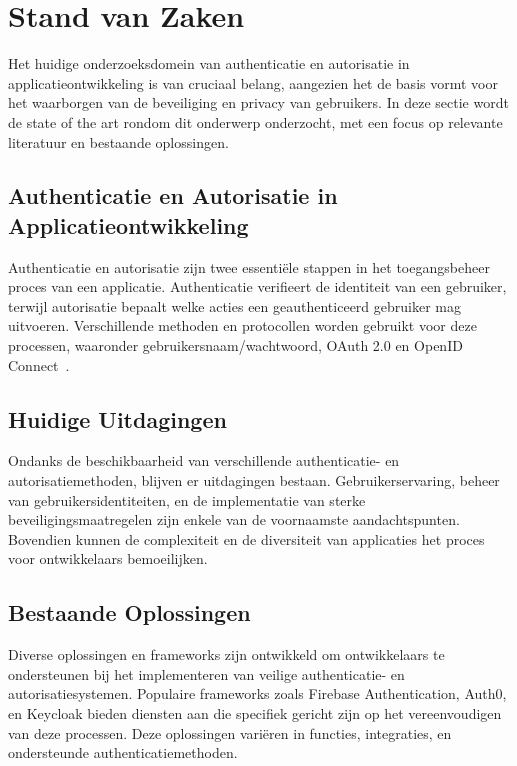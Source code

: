 
\section{Stand van Zaken}%
\label{sec:state-of-the-art}

Het huidige onderzoeksdomein van authenticatie en autorisatie in applicatieontwikkeling is van cruciaal belang, aangezien het de basis vormt voor het
waarborgen van de beveiliging en privacy van gebruikers. In deze sectie wordt de state of the art rondom dit onderwerp onderzocht, met een focus op
relevante literatuur en bestaande oplossingen.

\subsection{Authenticatie en Autorisatie in Applicatieontwikkeling}

Authenticatie en autorisatie zijn twee essentiële stappen in het toegangsbeheer proces van een applicatie. Authenticatie verifieert de identiteit van
een gebruiker, terwijl autorisatie bepaalt welke acties een geauthenticeerd gebruiker mag uitvoeren. Verschillende methoden en protocollen worden
gebruikt voor deze processen, waaronder gebruikersnaam/wachtwoord, OAuth 2.0 en OpenID Connect~\autocite{Hardt2012}.

\subsection{Huidige Uitdagingen}

Ondanks de beschikbaarheid van verschillende authenticatie- en autorisatiemethoden, blijven er uitdagingen bestaan. Gebruikerservaring, beheer van
gebruikersidentiteiten, en de implementatie van sterke beveiligingsmaatregelen zijn enkele van de voornaamste aandachtspunten. Bovendien kunnen de
complexiteit en de diversiteit van applicaties het proces voor ontwikkelaars bemoeilijken.

\subsection{Bestaande Oplossingen}

Diverse oplossingen en frameworks zijn ontwikkeld om ontwikkelaars te ondersteunen bij het implementeren van veilige authenticatie- en autorisatiesystemen.
Populaire frameworks zoals Firebase Authentication, Auth0, en Keycloak bieden diensten aan die specifiek gericht zijn op het vereenvoudigen van deze
processen. Deze oplossingen variëren in functies, integraties, en ondersteunde authenticatiemethoden.

